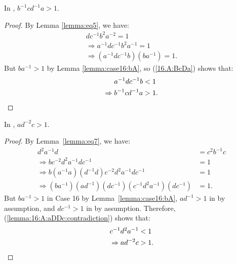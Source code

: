 \begin{lemma} In , $b^{-1}cd^{-1}a>1$.
\label{lemma:case16.A:BcDa}
\end{lemma}
\begin{proof} By Lemma \ref{lemma:eq5}, we have:
\begin{align}
dc^{-1}b^{2}a^{-2}=1\nonumber{}\\
\Rightarrow{}a^{-1}dc^{-1}b^{2}a^{-1}=1\nonumber{}\\
\Rightarrow{}(a^{-1}dc^{-1}b)(ba^{-1})=1.
\label{16.A:BcDa}
\end{align}
But $ba^{-1}>1$ by Lemma \ref{lemma:case16:bA}, so (\ref{16.A:BcDa}) shows that:
\begin{align*}
a^{-1}dc^{-1}b&<1\\
\Rightarrow{}b^{-1}cd^{-1}a&>1.\qedhere
\end{align*}
\end{proof}

\begin{lemma} In , $ad^{-2}c>1$.
\label{lemma:16:A:aDDc}
\end{lemma}
\begin{proof} By Lemma~\ref{lemma:eq7}, we have:
\begin{align}
d^{2}a^{-1}d&=c^{2}b^{-1}c\nonumber{}\\
\Rightarrow{}bc^{-2}d^{2}a^{-1}dc^{-1}&=1\nonumber{}\\
\Rightarrow{}b(a^{-1}a)(d^{-1}d)c^{-2}d^{2}a^{-1}dc^{-1}&=1\nonumber{}\\
\Rightarrow{}(ba^{-1})(ad^{-1})(dc^{-1})(c^{-1}d^{2}a^{-1})(dc^{-1})&=1.\label{lemma:16:A:aDDc:contradiction}
\end{align}
But $ba^{-1}>1$ in Case 16 by Lemma~\ref{lemma:case16:bA}, $ad^{-1}>1$ in  by assumption, and $dc^{-1}>1$ in  by assumption. Therefore, (\ref{lemma:16:A:aDDc:contradiction}) shows that:
\begin{align*}
c^{-1}d^{2}a^{-1}&<1\\
\Rightarrow{}ad^{-2}c&>1.\qedhere
\end{align*}
\end{proof}


